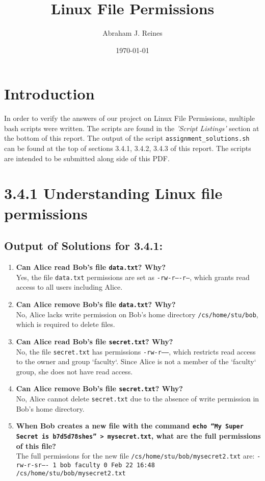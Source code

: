\documentclass{article}
\title{Linux File Permissions}
\author{Abraham J. Reines}
\date{\today}
\begin{document}
\maketitle

\section*{Introduction}
In order to verify the answers of our project on Linux File Permissions, multiple bash scripts were written. The scripts are found in the \textit{'Script Listings'} section at the bottom of this report. The output of the script \texttt{assignment\_solutions.sh} can be found at the top of sections 3.4.1, 3.4.2, 3.4.3 of this report. The scripts are intended to be submitted along side of this PDF. 

\section*{3.4.1 Understanding Linux file permissions}

\subsection*{Output of Solutions for 3.4.1:}


\begin{enumerate}
    \item \textbf{Can Alice read Bob's file \texttt{data.txt}? Why?}\\
    Yes, the file \texttt{data.txt} permissions are set as \texttt{-rw-r----r--}, which grants read access to all users including Alice.
    
    \item \textbf{Can Alice remove Bob's file \texttt{data.txt}? Why?}\\
    No, Alice lacks write permission on Bob's home directory \texttt{/cs/home/stu/bob}, which is required to delete files.
    
    \item \textbf{Can Alice read Bob's file \texttt{secret.txt}? Why?}\\
    No, the file \texttt{secret.txt} has permissions \texttt{-rw-r-----}, which restricts read access to the owner and group `faculty`. Since Alice is not a member of the `faculty` group, she does not have read access.
    
    \item \textbf{Can Alice remove Bob's file \texttt{secret.txt}? Why?}\\
    No, Alice cannot delete \texttt{secret.txt} due to the absence of write permission in Bob's home directory.
    
    \item \textbf{When Bob creates a new file with the command \texttt{echo “My Super Secret is b7d5d78shes” > mysecret.txt}, what are the full permissions of this file?}\\
The full permissions for the new file \texttt{/cs/home/stu/bob/mysecret2.txt} are: \texttt{-rw-r-sr---- 1 bob faculty 0 Feb 22 16:48 /cs/home/stu/bob/mysecret2.txt}
\end{enumerate}
\end{document}
